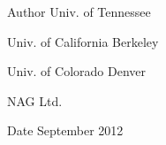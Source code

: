 \begin{DoxyAuthor}{Author}
Univ. of Tennessee 

Univ. of California Berkeley 

Univ. of Colorado Denver 

N\+A\+G Ltd. 
\end{DoxyAuthor}
\begin{DoxyDate}{Date}
September 2012 
\end{DoxyDate}
